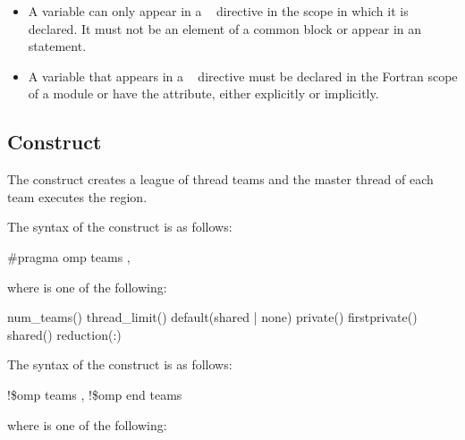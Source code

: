 {{{{\begin{itemize}
\item A variable can only appear in a ~ directive 
      in the scope in which it is declared. It must not be an element of a 
      common block or appear in an  statement.

\item A variable that appears in a ~ directive 
      must be declared in the Fortran scope of a module or have the 
       attribute, either explicitly or implicitly. 
\end{itemize}
\fortranspecificend







\subsection{ Construct}
\label{subsec:teams Construct}
\summary
The  construct creates a league of thread teams and the master thread of each 
team executes the region.

\syntax
\ccppspecificstart
The syntax of the  construct is as follows:

\begin{boxedcode}
\#pragma omp teams \plc{[clause[ [},\plc{] clause] ... ] new-line}
\end{boxedcode}

where  is one of the following:

\begin{indentedcodelist}
num\_teams()
thread\_limit()
default(shared \textnormal{|} none)
private()
firstprivate()
shared()
reduction(:)
\end{indentedcodelist}
\ccppspecificend

\fortranspecificstart
The syntax of the  construct is as follows:

\begin{boxedcode}
!\$omp teams \plc{[clause[ [},\plc{] clause] ... ]}
!\$omp end teams
\end{boxedcode}

where  is one of the following:

}}}}
